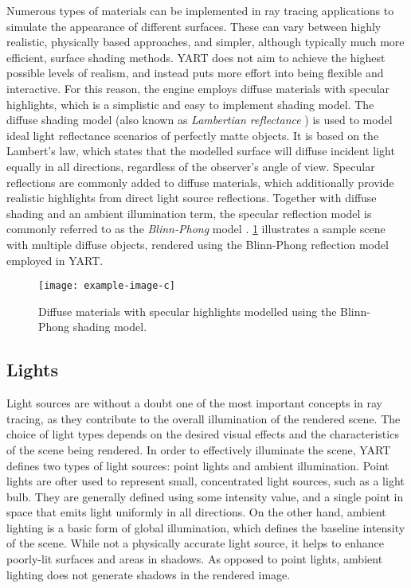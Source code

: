 Numerous types of materials can be implemented in ray tracing applications to simulate the appearance of different surfaces.
These can vary between highly realistic, physically based approaches, and simpler, although typically much more efficient, surface shading methods.
YART does not aim to achieve the highest possible levels of realism, and instead puts more effort into being flexible and interactive. 
For this reason, the engine employs diffuse materials with specular highlights, which is a simplistic and easy to implement shading model.
The diffuse shading model (also known as \textit{Lambertian reflectance} \supercite{Goral1984}) is used to model ideal light reflectance scenarios of perfectly matte objects. 
It is based on the Lambert's law, which states that the modelled surface will diffuse incident light equally in all directions, regardless of the observer's angle of view.
Specular reflections are commonly added to diffuse materials, which additionally provide realistic highlights from direct light source reflections.
Together with diffuse shading and an ambient illumination term, the specular reflection model is commonly referred to as the \textit{Blinn-Phong} model \supercite{Blinn1977}.
\cref{fig:Implementation/SceneRepresentation/materials} illustrates a sample scene with multiple diffuse objects, rendered using the Blinn-Phong reflection model employed in YART.

\vfill
\begin{figure}[!ht]
    \centering
    \texttt{[image: example-image-c]}
    \caption[Diffuse materials with specular highlights modelled using Blinn-Phong]{
        Diffuse materials with specular highlights modelled using the Blinn-Phong shading model.}
    \label{fig:Implementation/SceneRepresentation/materials}
\end{figure}
\vfill

\subsection{Lights}

Light sources are without a doubt one of the most important concepts in ray tracing, as they contribute to the overall illumination of the rendered scene.
The choice of light types depends on the desired visual effects and the characteristics of the scene being rendered.
In order to effectively illuminate the scene, YART defines two types of light sources: point lights and ambient illumination.
Point lights are ofter used to represent small, concentrated light sources, such as a light bulb. 
They are generally defined using some intensity value, and a single point in space that emits light uniformly in all directions.
On the other hand, ambient lighting is a basic form of global illumination, which defines the baseline intensity of the scene.
While not a physically accurate light source, it helps to enhance poorly-lit surfaces and areas in shadows. 
As opposed to point lights, ambient lighting does not generate shadows in the rendered image.

